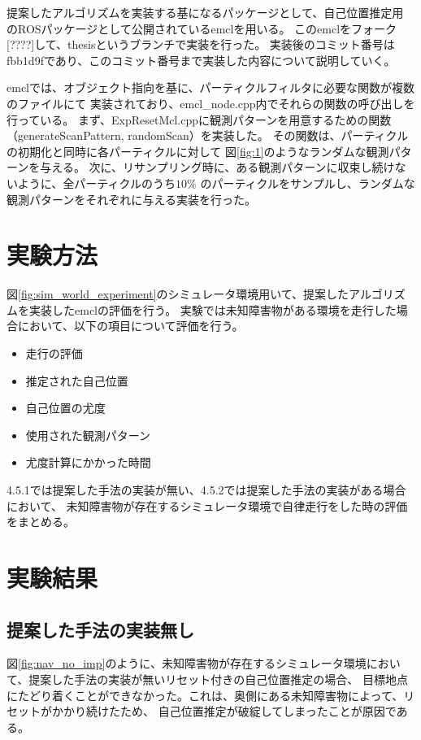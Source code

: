提案したアルゴリズムを実装する基になるパッケージとして、自己位置推定用
のROSパッケージとして公開されているemclを用いる。
このemclをフォーク[????]して、thesisというブランチで実装を行った。
実装後のコミット番号はfbb1d9fであり、このコミット番号まで実装した内容について説明していく。

emclでは、オブジェクト指向を基に、パーティクルフィルタに必要な関数が複数のファイルにて
実装されており、emcl\_node.cpp内でそれらの関数の呼び出しを行っている。
まず、ExpResetMcl.cppに観測パターンを用意するための関数（generateScanPattern, randomScan）を実装した。
その関数は、パーティクルの初期化と同時に各パーティクルに対して
図\ref{fig:1}のようなランダムな観測パターンを与える。
次に、リサンプリング時に、ある観測パターンに収束し続けないように、全パーティクルのうち$10\%$
のパーティクルをサンプルし、ランダムな観測パターンをそれぞれに与える実装を行った。

\section{実験方法}

図\ref{fig:sim_world_experiment}のシミュレータ環境用いて、提案したアルゴリズムを実装したemclの評価を行う。
実験では未知障害物がある環境を走行した場合において、以下の項目について評価を行う。
\begin{itemize}
  \item 走行の評価
  \item 推定された自己位置
  \item 自己位置の尤度
  \item 使用された観測パターン
  \item 尤度計算にかかった時間
\end{itemize}
4.5.1では提案した手法の実装が無い、4.5.2では提案した手法の実装がある場合において、
未知障害物が存在するシミュレータ環境で自律走行をした時の評価をまとめる。

\newpage

\section{実験結果}

\subsection{提案した手法の実装無し}

図\ref{fig:nav_no_imp}のように、未知障害物が存在するシミュレータ環境において、提案した手法の実装が無いリセット付きの自己位置推定の場合、
目標地点にたどり着くことができなかった。これは、奥側にある未知障害物によって、リセットがかかり続けたため、
自己位置推定が破綻してしまったことが原因である。

